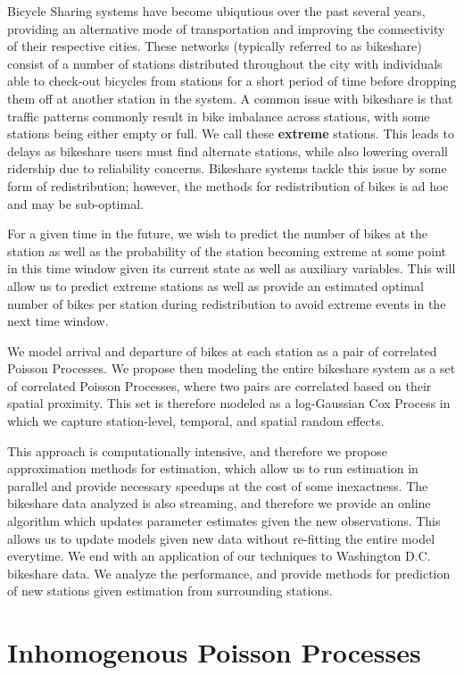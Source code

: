 \documentclass{acm_proc_article-sp}
\begin{document}
Bicycle Sharing systems have become ubiqutious over the past several years, providing an alternative mode of transportation and improving the connectivity of their respective cities.  These networks (typically referred to as bikeshare) consist of a number of stations distributed throughout the city with individuals able to check-out bicycles from stations for a short period of time before dropping them off at another station in the system.  A common issue with bikeshare is that traffic patterns commonly result in bike imbalance across stations, with some stations being either empty or full.  We call these {\bf extreme} stations.  This leads to delays as bikeshare users must find alternate stations, while also lowering overall ridership due to reliability concerns. Bikeshare systems tackle this issue by some form of redistribution; however, the methods for redistribution of bikes is ad hoc and may be sub-optimal.

For a given time in the future, we wish to predict the number of bikes at the station as well as the probability of the station becoming extreme at some point in this time window given its current state as well as auxiliary variables.  This will allow us to predict extreme stations as well as provide an estimated optimal number of bikes per station during redistribution to avoid extreme events in the next time window.

We model arrival and departure of bikes at each station as a pair of correlated Poisson Processes.  We propose then modeling the entire bikeshare system as a set of correlated Poisson Processes, where two pairs are correlated based on their spatial proximity.  This set is therefore modeled as a log-Gaussian Cox Process in which we capture station-level, temporal, and spatial random effects.  

This approach is computationally intensive, and therefore we propose approximation methods for estimation, which allow us to run estimation in parallel and provide necessary speedups at the cost of some inexactness.  The bikeshare data analyzed is also streaming, and therefore we provide an online algorithm which updates parameter estimates given the new observations.  This allows us to update models given new data without re-fitting the entire model everytime.  We end with an application of our techniques to Washington D.C. bikeshare data.  We analyze the performance, and provide methods for prediction of new stations given estimation from surrounding stations.


\section{Inhomogenous Poisson Processes}
\end{document}
